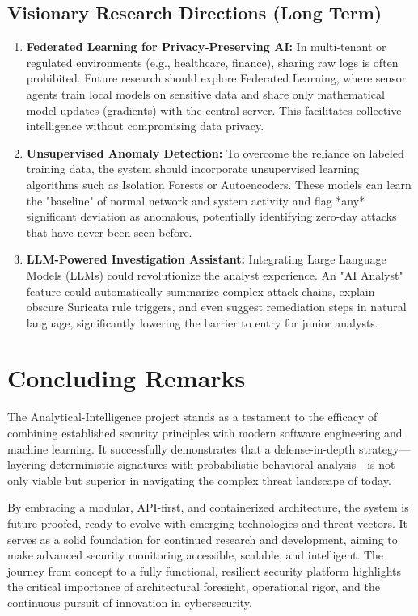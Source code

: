 \documentclass[12pt,a4paper]{report} %
\begin{document}
\subsection{Visionary Research Directions (Long Term)}
\begin{enumerate}
    \item \textbf{Federated Learning for Privacy-Preserving AI:} In multi-tenant or regulated environments (e.g., healthcare, finance), sharing raw logs is often prohibited. Future research should explore Federated Learning, where sensor agents train local models on sensitive data and share only mathematical model updates (gradients) with the central server. This facilitates collective intelligence without compromising data privacy.
    \item \textbf{Unsupervised Anomaly Detection:} To overcome the reliance on labeled training data, the system should incorporate unsupervised learning algorithms such as Isolation Forests or Autoencoders. These models can learn the "baseline" of normal network and system activity and flag *any* significant deviation as anomalous, potentially identifying zero-day attacks that have never been seen before.
    \item \textbf{LLM-Powered Investigation Assistant:} Integrating Large Language Models (LLMs) could revolutionize the analyst experience. An "AI Analyst" feature could automatically summarize complex attack chains, explain obscure Suricata rule triggers, and even suggest remediation steps in natural language, significantly lowering the barrier to entry for junior analysts.
\end{enumerate}

\section{Concluding Remarks}
The Analytical-Intelligence project stands as a testament to the efficacy of combining established security principles with modern software engineering and machine learning. It successfully demonstrates that a defense-in-depth strategy—layering deterministic signatures with probabilistic behavioral analysis—is not only viable but superior in navigating the complex threat landscape of today.

By embracing a modular, API-first, and containerized architecture, the system is future-proofed, ready to evolve with emerging technologies and threat vectors. It serves as a solid foundation for continued research and development, aiming to make advanced security monitoring accessible, scalable, and intelligent. The journey from concept to a fully functional, resilient security platform highlights the critical importance of architectural foresight, operational rigor, and the continuous pursuit of innovation in cybersecurity.


\pagestyle{fancy}
\fancyhf{}
\cfoot{\thepage}

\renewcommand{\bibname}{References}


\end{document}
